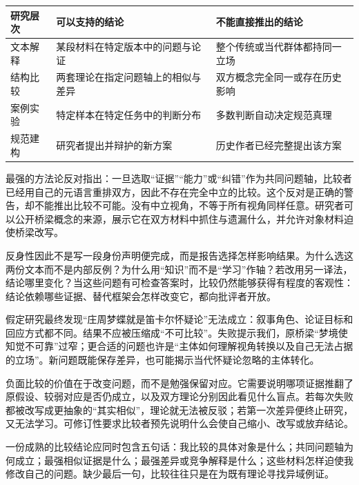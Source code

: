 \begin{center}
\begin{tabularx}{\textwidth}{p{}XX}
\toprule
研究层次 & 可以支持的结论 & 不能直接推出的结论\\
\midrule
文本解释 & 某段材料在特定版本中的问题与论证 & 整个传统或当代群体都持同一立场\\
结构比较 & 两套理论在指定问题轴上的相似与差异 & 双方概念完全同一或存在历史影响\\
案例实验 & 特定样本在特定任务中的判断分布 & 多数判断自动决定规范真理\\
规范建构 & 研究者提出并辩护的新方案 & 历史作者已经完整提出该方案\\
\bottomrule
\end{tabularx}
\end{center}

最强的方法论反对指出：一旦选取“证据”“能力”或“纠错”作为共同问题轴，比较者已经用自己的元语言重排双方，因此不存在完全中立的比较。这个反对是正确的警告，却不能推出比较不可能。没有中立视角，不等于所有视角同样任意。研究者可以公开桥梁概念的来源，展示它在双方材料中抓住与遗漏什么，并允许对象材料迫使桥梁改写。

反身性因此不是写一段身份声明便完成，而是报告选择怎样影响结果。为什么选这两份文本而不是内部反例？为什么用“知识”而不是“学习”作轴？若改用另一译法，结论哪里变化？当这些问题有可检查答案时，比较仍然能够获得有程度的客观性：结论依赖哪些证据、替代框架会怎样改变它，都向批评者开放。

假定研究最终发现“庄周梦蝶就是笛卡尔怀疑论”无法成立：叙事角色、论证目标和回应方式都不同。结果不应被压缩成“不可比较”。失败提示我们，原桥梁“梦境使知觉不可靠”过窄；更合适的问题也许是“主体如何理解视角转换以及自己无法占据的立场”。新问题既能保存差异，也可能揭示当代怀疑论忽略的主体转化。

负面比较的价值在于改变问题，而不是勉强保留对应。它需要说明哪项证据推翻了原假设、较弱对应是否仍成立，以及双方理论分别因此看见什么盲点。若每次失败都被改写成更抽象的“其实相似”，理论就无法被反驳；若第一次差异便终止研究，又无法学习。可修订性要求比较者预先说明什么会使自己缩小、改写或放弃结论。

\begin{argumentbox}
一份成熟的比较结论应同时包含五句话：我比较的具体对象是什么；共同问题轴为何成立；最强相似证据是什么；最强差异或竞争解释是什么；这些材料怎样迫使我修改自己的问题。缺少最后一句，比较往往只是在为既有理论寻找异域例证。
\end{argumentbox}

